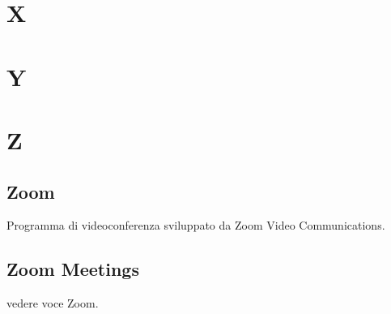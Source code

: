 \section{X}
\section{Y}
\section{Z}
\subsection{Zoom}
Programma di videoconferenza sviluppato da Zoom Video Communications.
\subsection{Zoom Meetings}
vedere voce Zoom.


